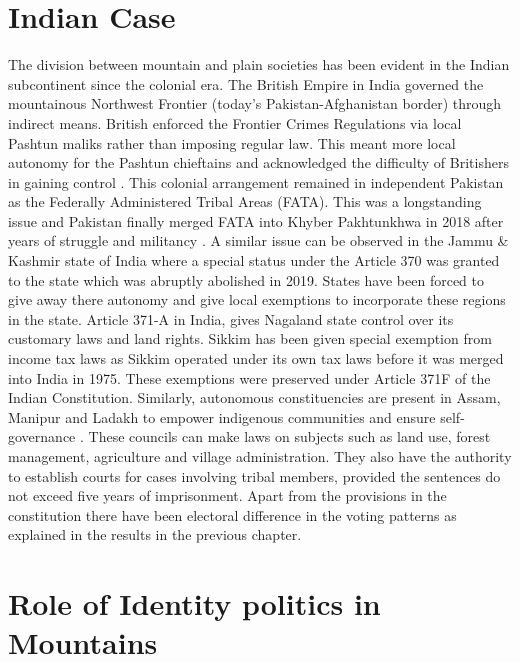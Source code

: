 \section{Indian Case}
The division between mountain and plain societies has been evident in the Indian subcontinent since the colonial era. The British Empire in India governed the mountainous Northwest Frontier (today’s Pakistan-Afghanistan border) through indirect means. British enforced the Frontier Crimes Regulations via local Pashtun maliks rather than imposing regular law. This meant more local autonomy for the Pashtun chieftains and acknowledged the difficulty of Britishers in gaining control \citep{ali2013indigenous}. This colonial arrangement remained in independent Pakistan as the Federally Administered Tribal Areas (FATA). This was a longstanding issue and  Pakistan finally merged FATA into Khyber Pakhtunkhwa in 2018 after years of struggle and militancy \citep{horgan2008leaving}. A similar issue can be observed in the Jammu \& Kashmir state of India where a special status under the Article 370 was granted to the state which was abruptly abolished in 2019. States have been forced to give away there autonomy and give local exemptions to incorporate these regions in the state. Article 371-A in India, gives Nagaland state control over its customary laws and land rights. Sikkim has been given special exemption from income tax laws as Sikkim operated under its own tax laws before it was merged into India in 1975. These exemptions were preserved under Article 371F of the Indian Constitution. Similarly, autonomous constituencies are present in  Assam, Manipur and Ladakh to empower indigenous communities and ensure self-governance \citep{sixthschedule}. These councils can make laws on subjects such as land use, forest management, agriculture and village administration. They also have the authority to establish courts for cases involving tribal members, provided the sentences do not exceed five years of imprisonment. Apart from the provisions in the constitution there have been electoral difference in the voting patterns as explained in the results in the previous chapter. 

\section{Role of Identity politics in Mountains}

